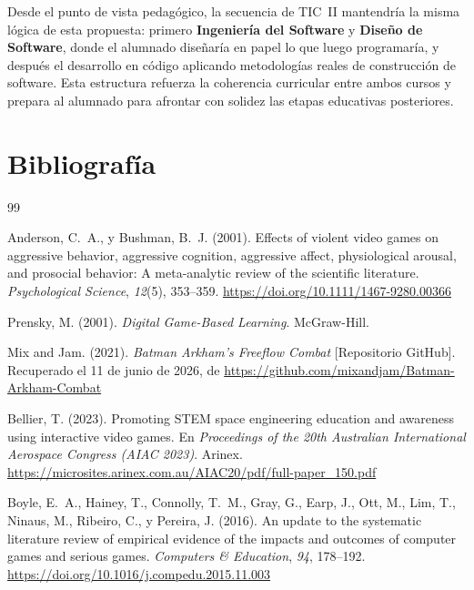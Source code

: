 \documentclass[a4paper,12pt]{article}
\begin{document}
Desde el punto de vista pedagógico, la secuencia de TIC~II mantendría la misma lógica de esta propuesta: primero \textbf{Ingeniería del Software} y \textbf{Diseño de Software}, donde el alumnado diseñaría en papel lo que luego programaría, y después el desarrollo en código aplicando metodologías reales de construcción de software. Esta estructura refuerza la coherencia curricular entre ambos cursos y prepara al alumnado para afrontar con solidez las etapas educativas posteriores.
\newpage

\section{Bibliografía}


\begin{thebibliography}{99}

Anderson, C.~A., y Bushman, B.~J. (2001). Effects of violent video games on aggressive behavior, aggressive cognition, aggressive affect, physiological arousal, and prosocial behavior: A meta-analytic review of the scientific literature. \textit{Psychological Science}, \textit{12}(5), 353--359. \url{https://doi.org/10.1111/1467-9280.00366}

Prensky, M. (2001). \textit{Digital Game-Based Learning}. McGraw-Hill.

Mix and Jam. (2021). \textit{Batman Arkham's Freeflow Combat} [Repositorio GitHub]. Recuperado el 11 de junio de 2026, de \url{https://github.com/mixandjam/Batman-Arkham-Combat}

Bellier, T. (2023). Promoting STEM space engineering education and awareness using interactive video games. En \textit{Proceedings of the 20th Australian International Aerospace Congress (AIAC 2023)}. Arinex. \url{https://microsites.arinex.com.au/AIAC20/pdf/full-paper_150.pdf}

Boyle, E.~A., Hainey, T., Connolly, T.~M., Gray, G., Earp, J., Ott, M., Lim, T., Ninaus, M., Ribeiro, C., y Pereira, J. (2016). An update to the systematic literature review of empirical evidence of the impacts and outcomes of computer games and serious games. \textit{Computers \& Education}, \textit{94}, 178--192. \url{https://doi.org/10.1016/j.compedu.2015.11.003}


\end{thebibliography}
\end{document}
